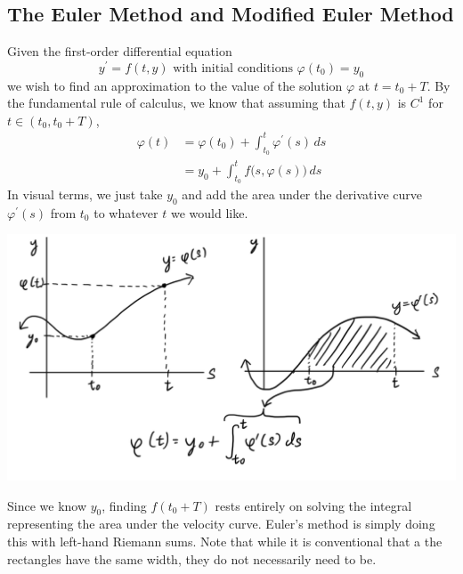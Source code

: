 \documentclass{article}
\theoremstyle{remark}
\theoremstyle{definition}
\begin{document}
  \subsection{The Euler Method and Modified Euler Method}

    Given the first-order differential equation
    \[y^\prime = f(t, y) \text{ with initial conditions } \varphi(t_0) = y_0\]
    we wish to find an approximation to the value of the solution $\varphi$ at $t = t_0 + T$. By the fundamental rule of calculus, we know that assuming that $f(t, y)$ is $C^1$ for $t \in (t_0, t_0 + T)$, 
    \begin{align*}
        \varphi(t) & = \varphi(t_0) + \int_{t_0}^t \varphi^\prime (s) \,ds \\
        & = y_0 + \int_{t_0}^t f\big(s, \varphi(s) \big)\,ds
    \end{align*}
    In visual terms, we just take $y_0$ and add the area under the derivative curve $\varphi^\prime (s)$ from $t_0$ to whatever $t$ we would like. 
    \begin{center}
        \includegraphics[scale=0.25]{img/Fundamental_Theorem_of_Calculus.PNG}
    \end{center}
    Since we know $y_0$, finding $f(t_0 + T)$ rests entirely on solving the integral representing the area under the velocity curve. Euler's method is simply doing this with left-hand Riemann sums. Note that while it is conventional that a the rectangles have the same width, they do not necessarily need to be. 
\end{document}
